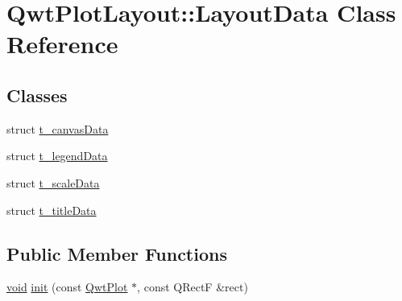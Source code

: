 \hypertarget{class_qwt_plot_layout_1_1_layout_data}{\section{Qwt\-Plot\-Layout\-:\-:Layout\-Data Class Reference}
\label{class_qwt_plot_layout_1_1_layout_data}
}
\subsection*{Classes}
\begin{DoxyCompactItemize}
\item 
struct \hyperlink{struct_qwt_plot_layout_1_1_layout_data_1_1t__canvas_data}{t\-\_\-canvas\-Data}
\item 
struct \hyperlink{struct_qwt_plot_layout_1_1_layout_data_1_1t__legend_data}{t\-\_\-legend\-Data}
\item 
struct \hyperlink{struct_qwt_plot_layout_1_1_layout_data_1_1t__scale_data}{t\-\_\-scale\-Data}
\item 
struct \hyperlink{struct_qwt_plot_layout_1_1_layout_data_1_1t__title_data}{t\-\_\-title\-Data}
\end{DoxyCompactItemize}
\subsection*{Public Member Functions}
\begin{DoxyCompactItemize}
\item 
\hyperlink{group___u_a_v_objects_plugin_ga444cf2ff3f0ecbe028adce838d373f5c}{void} \hyperlink{class_qwt_plot_layout_1_1_layout_data_acd67ef9c3d6b1caa1059fe6614171c1f}{init} (const \hyperlink{class_qwt_plot}{Qwt\-Plot} $\ast$, const Q\-Rect\-F \&rect)
\end{DoxyCompactItemize}
